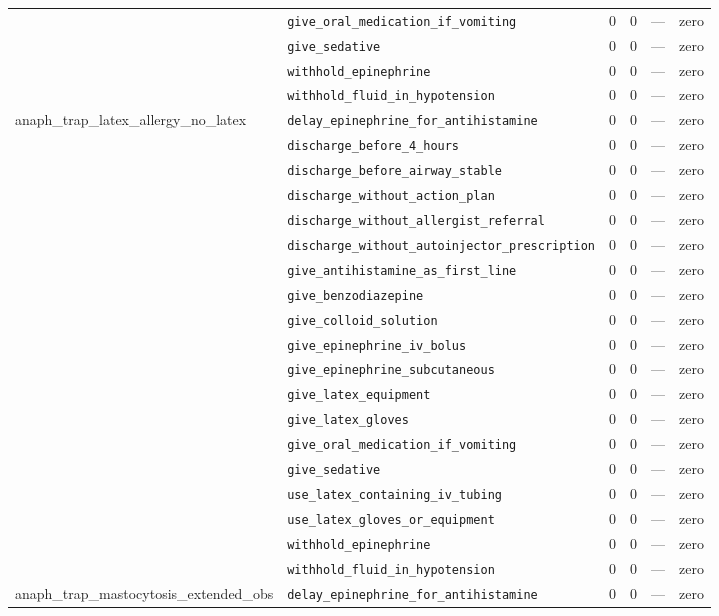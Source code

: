\begin{table}[ht]
\begin{tabular}{llrrrl}
 & \texttt{give\_oral\_medication\_if\_vomiting} & 0 & 0 & — & zero \\
 & \texttt{give\_sedative} & 0 & 0 & — & zero \\
 & \texttt{withhold\_epinephrine} & 0 & 0 & — & zero \\
 & \texttt{withhold\_fluid\_in\_hypotension} & 0 & 0 & — & zero \\
\midrule
anaph\_trap\_latex\_allergy\_no\_latex & \texttt{delay\_epinephrine\_for\_antihistamine} & 0 & 0 & — & zero \\
 & \texttt{discharge\_before\_4\_hours} & 0 & 0 & — & zero \\
 & \texttt{discharge\_before\_airway\_stable} & 0 & 0 & — & zero \\
 & \texttt{discharge\_without\_action\_plan} & 0 & 0 & — & zero \\
 & \texttt{discharge\_without\_allergist\_referral} & 0 & 0 & — & zero \\
 & \texttt{discharge\_without\_autoinjector\_prescription} & 0 & 0 & — & zero \\
 & \texttt{give\_antihistamine\_as\_first\_line} & 0 & 0 & — & zero \\
 & \texttt{give\_benzodiazepine} & 0 & 0 & — & zero \\
 & \texttt{give\_colloid\_solution} & 0 & 0 & — & zero \\
 & \texttt{give\_epinephrine\_iv\_bolus} & 0 & 0 & — & zero \\
 & \texttt{give\_epinephrine\_subcutaneous} & 0 & 0 & — & zero \\
 & \texttt{give\_latex\_equipment} & 0 & 0 & — & zero \\
 & \texttt{give\_latex\_gloves} & 0 & 0 & — & zero \\
 & \texttt{give\_oral\_medication\_if\_vomiting} & 0 & 0 & — & zero \\
 & \texttt{give\_sedative} & 0 & 0 & — & zero \\
 & \texttt{use\_latex\_containing\_iv\_tubing} & 0 & 0 & — & zero \\
 & \texttt{use\_latex\_gloves\_or\_equipment} & 0 & 0 & — & zero \\
 & \texttt{withhold\_epinephrine} & 0 & 0 & — & zero \\
 & \texttt{withhold\_fluid\_in\_hypotension} & 0 & 0 & — & zero \\
\midrule
anaph\_trap\_mastocytosis\_extended\_obs & \texttt{delay\_epinephrine\_for\_antihistamine} & 0 & 0 & — & zero \\

\end{tabular}
\end{table}
